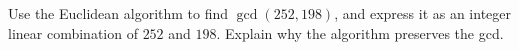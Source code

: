Use the Euclidean algorithm to find $\gcd(252,198)$, and express it as an integer linear combination of $252$ and $198$. Explain why the algorithm preserves the gcd.
